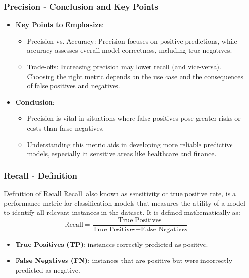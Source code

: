 \documentclass[aspectratio=169]{beamer}
\begin{document}
\begin{frame}[fragile]
    \frametitle{Precision - Conclusion and Key Points}
    \begin{itemize}
        \item \textbf{Key Points to Emphasize}:
        \begin{itemize}
            \item Precision vs. Accuracy: Precision focuses on positive predictions, while accuracy assesses overall model correctness, including true negatives.
            \item Trade-offs: Increasing precision may lower recall (and vice-versa). Choosing the right metric depends on the use case and the consequences of false positives and negatives.
        \end{itemize}
        
        \item \textbf{Conclusion}:
        \begin{itemize}
            \item Precision is vital in situations where false positives pose greater risks or costs than false negatives.
            \item Understanding this metric aids in developing more reliable predictive models, especially in sensitive areas like healthcare and finance.
        \end{itemize}
    \end{itemize}
\end{frame}

\begin{frame}[fragile]
    \frametitle{Recall - Definition}
    \begin{block}{Definition of Recall}
        Recall, also known as sensitivity or true positive rate, is a performance metric for classification models that measures the ability of a model to identify all relevant instances in the dataset. It is defined mathematically as:
        \begin{equation}
            \text{Recall} = \frac{\text{True Positives}}{\text{True Positives} + \text{False Negatives}}
        \end{equation}
    \end{block}
    
    \begin{itemize}
        \item \textbf{True Positives (TP)}: instances correctly predicted as positive.
        \item \textbf{False Negatives (FN)}: instances that are positive but were incorrectly predicted as negative.
    \end{itemize}
\end{frame}
\end{document}
